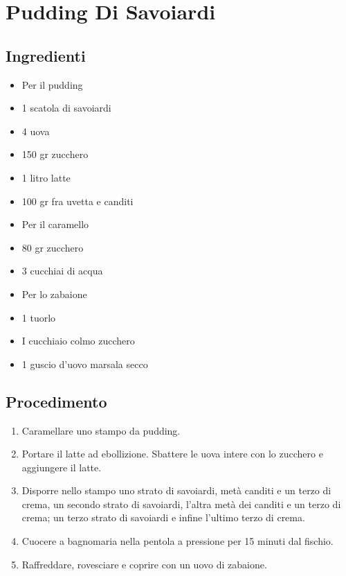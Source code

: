 \section{Pudding Di Savoiardi}
\subsection{Ingredienti}
\begin{itemize}
\item Per il pudding  
\item 1 scatola di savoiardi  
\item 4 uova  
\item 150 gr zucchero  
\item 1 litro latte   
\item 100 gr fra uvetta e canditi  
\item Per il caramello  
\item 80 gr zucchero  
\item 3 cucchiai di acqua  
\item Per lo zabaione  
\item 1 tuorlo  
\item I cucchiaio colmo zucchero  
\item 1 guscio d'uovo marsala secco
\end{itemize}
\subsection{Procedimento}
\begin{enumerate}
\item  Caramellare uno stampo da pudding.   
\item  Portare il latte ad ebollizione. Sbattere le uova intere con lo zucchero e aggiungere il latte.   
\item  Disporre nello stampo uno strato di savoiardi, metà canditi e un terzo di crema, un secondo strato di savoiardi, l'altra metà dei canditi e un terzo di crema; un terzo strato di savoiardi e infine l'ultimo terzo di crema.  
\item  Cuocere a bagnomaria nella pentola a pressione per 15 minuti dal fischio.  
\item  Raffreddare, rovesciare e coprire con un uovo di zabaione.
\end{enumerate}
